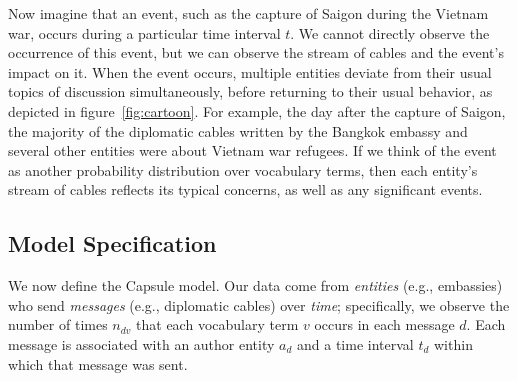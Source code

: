 Now imagine that an event, such as the capture of Saigon during the
Vietnam war, occurs during a particular time interval $t$. We cannot
directly observe the occurrence of this event, but we can observe the
stream of cables and the event's impact on it. When the event occurs,
multiple entities deviate from their usual topics of discussion
simultaneously, before returning to their usual behavior, as depicted
in figure~\ref{fig:cartoon}. For example, the day after the capture of
Saigon, the majority of the diplomatic cables written by the Bangkok
embassy and several other entities were about Vietnam war refugees. If
we think of the event as another probability distribution over
vocabulary terms, then each entity's stream of cables reflects its
typical concerns, as well as any significant events.




\subsection{Model Specification}
\label{sec:model_spec}

We now define the Capsule model. Our data come from \emph{entities}
(e.g., embassies) who send \emph{messages} (e.g., diplomatic cables)
over \emph{time}; specifically, we observe the number of times
$n_{dv}$ that each vocabulary term $v$ occurs in each message
$d$. Each message is associated with an author entity $a_d$ and a time
interval $t_d$ within which that message was sent.

